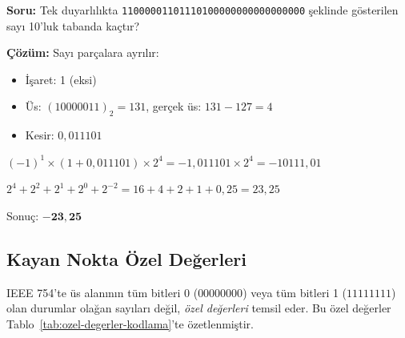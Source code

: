 \begin{ornek}[5.17]
\textbf{Soru:} Tek duyarlılıkta \texttt{11000001101110100000000000000000} şeklinde gösterilen sayı 10'luk tabanda kaçtır?

\textbf{Çözüm:} Sayı parçalara ayrılır:

\begin{center}
\end{center}

\begin{itemize}
\item İşaret: 1 (eksi)
\item Üs: $(10000011)_2 = 131$, gerçek üs: $131 - 127 = 4$
\item Kesir: $0{,}011101$
\end{itemize}

$(-1)^1 \times (1 + 0{,}011101) \times 2^4 = -1{,}011101 \times 2^4 = -10111{,}01$

\begin{center}
$2^4 + 2^2 + 2^1 + 2^0 + 2^{-2} = 16 + 4 + 2 + 1 + 0{,}25 = 23{,}25$
\end{center}

Sonuç: $\mathbf{-23{,}25}$
\end{ornek}

\subsection{Kayan Nokta Özel Değerleri}

IEEE 754'te üs alanının tüm bitleri 0 ($00000000$) veya tüm bitleri 1 ($11111111$) olan durumlar olağan sayıları değil, \emph{özel değerleri} temsil eder. Bu özel değerler Tablo~\ref{tab:ozel-degerler-kodlama}'te özetlenmiştir.

